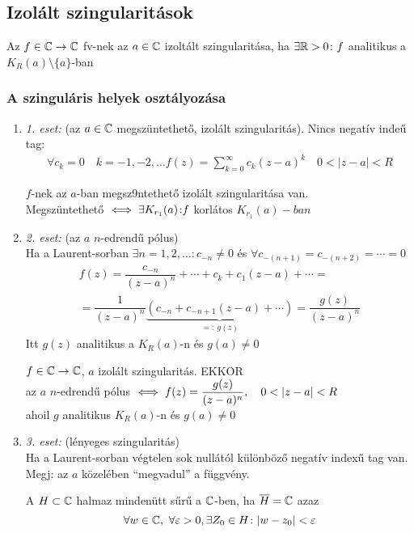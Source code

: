 \subsection{Izolált szingularitások}
\begin{de}
  Az $f\in \mathbb{C}\to\mathbb{C}$ fv-nek az $a\in\mathbb{C}$ izoltált szingularitása, ha $\exists \mathbb{R}>0\colon f$ analitikus a$K_R(a)\setminus\{a\}$-ban
\end{de}

\subsubsection{A szinguláris helyek osztályozása}
\begin{enumerate}
  \item \emph{1. eset:} (az $a\in\mathbb{C}$ megszüntethető, izolált szingularitás). Nincs negatív indeű tag:
    \begin{gather*}
      \forall c_k = 0\quad k=-1,-2,\ldots
      f(z) = \sum_{k=0}^\infty c_k(z-a)^k\quad 0<|z-a|<R
    \end{gather*}
    \begin{te}
      $f$-nek az $a$-ban megsz9ntethető izolált szingularitása van.\\
      Megszüntethető $\iff \exists K_{r_1}(a)\colon\\f$ korlátos $K_{r_1}(a)-ban$
    \end{te}
  \item \emph{2. eset:} (az $a$ $n$-edrendű pólus)\\
    Ha a Laurent-sorban $\exists n=1,2,\ldots\colon c_{-n} \neq 0$ és $\forall c_{-(n+1)}=c_{-(n+2)}=\dotsb=0$
    \begin{gather*}
      f(z) = \dfrac{c_{-n}}{(z-a)^n} + \dotsb + c_k + c_1(z-a) + \dotsb =\\= \dfrac1{(z-a)^n} \underbrace{(c_{-n} +
      c_{-n+1}(z-a)+\dotsb )}_{{ }=:\ g(z)}= \dfrac{g(z)}{(z-a)^n}
    \end{gather*}
    Itt $g(z)$ analitikus a $K_R(a)$-n és $g(a) \neq 0$
    \begin{te}
      $f\in\mathbb{C}\to\mathbb{C}$, $a$ izolált szingularitás. EKKOR\\
      az $a$ $n$-edrendű pólus $\iff\di f(z) = \dfrac{g(z)}{(z-a)^n},\quad 0<|z-a|<R$ \\
      ahoil $g$ analitikus $K_R(a)$-n és $g(a) \neq 0$
    \end{te}
  \item \emph{3. eset:} (lényeges szingularitás)\\
    Ha a Laurent-sorban végtelen sok nullától különböző negatív indexű tag van.\\
    Megj: az $a$ közelében ``megvadul'' a függvény.\\
    \begin{de}
      A $H\subset \mathbb{C}$ halmaz mindenütt sűrű a $\mathbb{C}$-ben, ha $\overline{H}=\mathbb{C}$ azaz
      \[\forall w \in \mathbb{C},\ \forall \varepsilon >0, \exists Z_0\in H\colon |w-z_0| < \varepsilon\]
    \end{de}


\end{enumerate}
